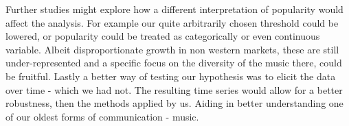 \documentclass{article}
\begin{document}
Further studies might explore how a different interpretation of popularity would affect the analysis. For example our quite arbitrarily chosen threshold could be lowered, or popularity could be treated as categorically or even continuous variable. Albeit disproportionate growth in non western markets, these are still under-represented and a specific focus on the diversity of the music there, could be fruitful. Lastly a better way of testing our hypothesis was to elicit the data over time - which we had not. The resulting time series would allow for a better robustness, then the methods applied by us. Aiding in better understanding one of our oldest forms of communication - music.   




\end{document}

